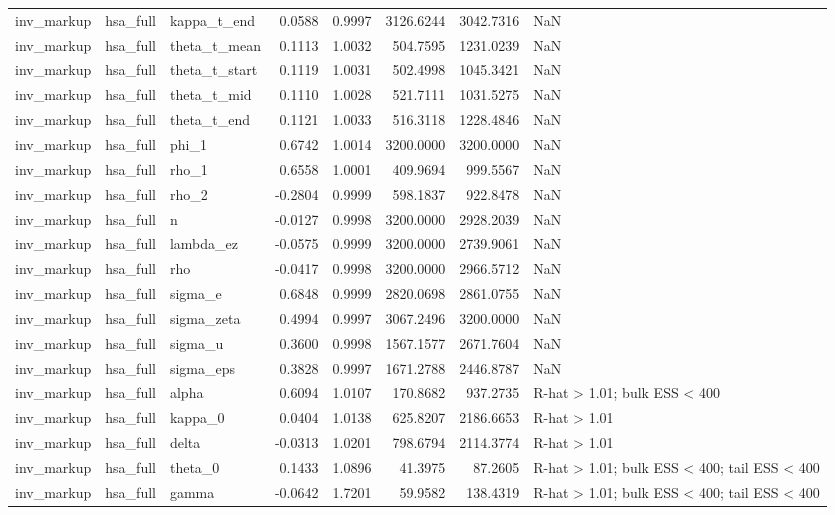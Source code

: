 \begin{tabular}{lllrrrrl}
inv\_markup & hsa\_full & kappa\_t\_end & 0.0588 & 0.9997 & 3126.6244 & 3042.7316 & NaN \\
inv\_markup & hsa\_full & theta\_t\_mean & 0.1113 & 1.0032 & 504.7595 & 1231.0239 & NaN \\
inv\_markup & hsa\_full & theta\_t\_start & 0.1119 & 1.0031 & 502.4998 & 1045.3421 & NaN \\
inv\_markup & hsa\_full & theta\_t\_mid & 0.1110 & 1.0028 & 521.7111 & 1031.5275 & NaN \\
inv\_markup & hsa\_full & theta\_t\_end & 0.1121 & 1.0033 & 516.3118 & 1228.4846 & NaN \\
inv\_markup & hsa\_full & phi\_1 & 0.6742 & 1.0014 & 3200.0000 & 3200.0000 & NaN \\
inv\_markup & hsa\_full & rho\_1 & 0.6558 & 1.0001 & 409.9694 & 999.5567 & NaN \\
inv\_markup & hsa\_full & rho\_2 & -0.2804 & 0.9999 & 598.1837 & 922.8478 & NaN \\
inv\_markup & hsa\_full & n & -0.0127 & 0.9998 & 3200.0000 & 2928.2039 & NaN \\
inv\_markup & hsa\_full & lambda\_ez & -0.0575 & 0.9999 & 3200.0000 & 2739.9061 & NaN \\
inv\_markup & hsa\_full & rho & -0.0417 & 0.9998 & 3200.0000 & 2966.5712 & NaN \\
inv\_markup & hsa\_full & sigma\_e & 0.6848 & 0.9999 & 2820.0698 & 2861.0755 & NaN \\
inv\_markup & hsa\_full & sigma\_zeta & 0.4994 & 0.9997 & 3067.2496 & 3200.0000 & NaN \\
inv\_markup & hsa\_full & sigma\_u & 0.3600 & 0.9998 & 1567.1577 & 2671.7604 & NaN \\
inv\_markup & hsa\_full & sigma\_eps & 0.3828 & 0.9997 & 1671.2788 & 2446.8787 & NaN \\
inv\_markup & hsa\_full & alpha & 0.6094 & 1.0107 & 170.8682 & 937.2735 & R-hat > 1.01; bulk ESS < 400 \\
inv\_markup & hsa\_full & kappa\_0 & 0.0404 & 1.0138 & 625.8207 & 2186.6653 & R-hat > 1.01 \\
inv\_markup & hsa\_full & delta & -0.0313 & 1.0201 & 798.6794 & 2114.3774 & R-hat > 1.01 \\
inv\_markup & hsa\_full & theta\_0 & 0.1433 & 1.0896 & 41.3975 & 87.2605 & R-hat > 1.01; bulk ESS < 400; tail ESS < 400 \\
inv\_markup & hsa\_full & gamma & -0.0642 & 1.7201 & 59.9582 & 138.4319 & R-hat > 1.01; bulk ESS < 400; tail ESS < 400 \\

\end{tabular}
